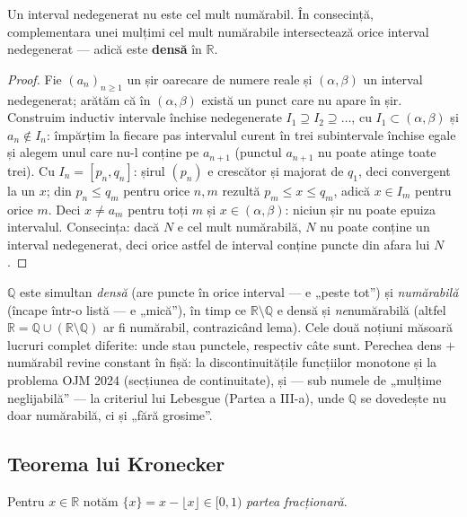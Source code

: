 \begin{lema}
Un interval nedegenerat nu este cel mult numărabil. În consecință, complementara unei mulțimi cel mult numărabile intersectează orice interval nedegenerat --- adică este \textbf{densă} în $\mathbb{R}$.
\end{lema}
\begin{proof}
Fie $(a_n)_{n\ge1}$ un șir oarecare de numere reale și $(\alpha,\beta)$ un interval nedegenerat; arătăm că în $(\alpha,\beta)$ există un punct care nu apare în șir. Construim inductiv intervale închise nedegenerate $I_1\supseteq I_2\supseteq\dots$, cu $I_1\subset(\alpha,\beta)$ și $a_n\notin I_n$: împărțim la fiecare pas intervalul curent în trei subintervale închise egale și alegem unul care nu-l conține pe $a_{n+1}$ (punctul $a_{n+1}$ nu poate atinge toate trei). Cu $I_n=[p_n,q_n]$: șirul $(p_n)$ e crescător și majorat de $q_1$, deci convergent la un $x$; din $p_n\le q_m$ pentru orice $n,m$ rezultă $p_m\le x\le q_m$, adică $x\in I_m$ pentru orice $m$. Deci $x\neq a_m$ pentru toți $m$ și $x\in(\alpha,\beta)$: niciun șir nu poate epuiza intervalul. Consecința: dacă $N$ e cel mult numărabilă, $N$ nu poate conține un interval nedegenerat, deci orice astfel de interval conține puncte din afara lui $N$.
\end{proof}

\begin{obs}
$\mathbb{Q}$ este simultan \emph{densă} (are puncte în orice interval --- e „peste tot'') și \emph{numărabilă} (încape într-o listă --- e „mică''), în timp ce $\mathbb{R}\setminus\mathbb{Q}$ e densă și \emph{ne}numărabilă (altfel $\mathbb{R}=\mathbb{Q}\cup(\mathbb{R}\setminus\mathbb{Q})$ ar fi numărabil, contrazicând lema). Cele două noțiuni măsoară lucruri complet diferite: unde stau punctele, respectiv câte sunt. Perechea dens $+$ numărabil revine constant în fișă: la discontinuitățile funcțiilor monotone și la problema OJM 2024 (secțiunea de continuitate), și --- sub numele de „mulțime neglijabilă'' --- la criteriul lui Lebesgue (Partea a III-a), unde $\mathbb{Q}$ se dovedește nu doar numărabilă, ci și „fără grosime''.
\end{obs}

\subsection{Teorema lui Kronecker}

Pentru $x\in\mathbb{R}$ notăm $\{x\}=x-\lfloor x\rfloor\in[0,1)$ \emph{partea fracționară}.

